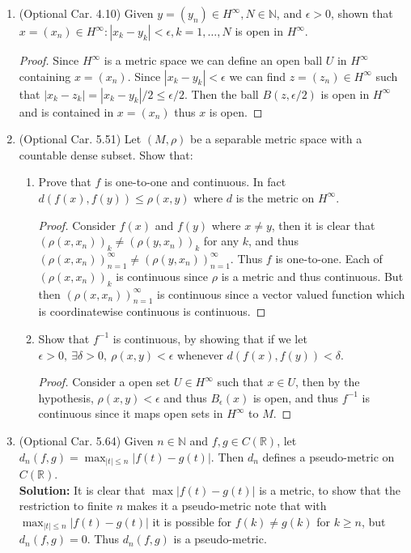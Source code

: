 \documentclass{article}
\newtheorem{proof}{Proof}
\def\ge{\geqslant}
\def\le{\leqslant}
\def\max{\operatorname{max}}
\def\NN{\mathbb N}
\def\RR{\mathbb R}
\begin{document}
\begin{enumerate}
\item (Optional Car. 4.10) Given $y=(y_n)\in H^\infty, N\in \NN$, and
$\epsilon>0$, shown that $x=(x_n)\in H^\infty: |x_k-y_k|<\epsilon, k=1,\ldots,N$
is open in $H^\infty$.
\begin{proof}
Since $H^\infty$ is a metric space we can define an open ball $U$ in $H^\infty$
containing $x=(x_n)$. Since $|x_k-y_k|<\epsilon$ we can 
find $z=(z_n)\in H^\infty$ such that $|x_k-z_k|=|x_k-y_k|/2 \le \epsilon/2$.
Then the ball $B(z,\epsilon/2)$ is open in $H^\infty$ and is contained in 
$x=(x_n)$ thus $x$ is open.
\end{proof}

\item (Optional Car. 5.51) Let $(M,\rho)$ be a separable metric space
with a countable dense subset. Show that:
\begin{enumerate}
\item{Prove that $f$ is one-to-one and continuous. In fact 
$d(f(x),f(y)) \le \rho(x,y)$
where $d$ is the metric on $H^\infty$.}
\begin{proof}
Consider $f(x)$ and $f(y)$ where $x\ne y$, then it is clear that
$(\rho(x,x_n))_k \ne (\rho(y,x_n))_k$ for any $k$, and thus
$(\rho(x,x_n))_{n=1}^\infty \ne (\rho(y,x_n))_{n=1}^\infty$. Thus $f$ is
one-to-one. Each of $(\rho(x,x_n))_k$ is continuous since $\rho$ is
a metric and thus continuous. But then $(\rho(x,x_n))_{n=1}^\infty$
is continuous since a vector valued function which is coordinatewise
continuous is continuous.
\end{proof}
\item{Show that $f^{-1}$ is continuous, by showing that if we let 
$\epsilon>0, \ \exists \delta>0,\ \rho(x,y)<\epsilon$ whenever
$d(f(x),f(y))<\delta$.
}
\begin{proof}
Consider a open set $U\in H^\infty$ such that $x\in U$, then by the
hypothesis, $\rho(x,y)<\epsilon$ and thus $B_\epsilon(x)$ is open, and thus
$f^{-1}$ is continuous since it maps open sets in $H^\infty$ to $M$.
\end{proof}
\end{enumerate}

\item (Optional Car. 5.64) Given $n\in \NN$ and $f,g \in C(\RR)$, let
$d_n(f,g)=\max_{|t|\le n}|f(t)-g(t)|$. Then $d_n$ defines a pseudo-metric
on $C(\RR)$.\\
\textbf{Solution:} It is clear that $\max |f(t)-g(t)|$ is a metric, 
to show that the restriction to finite $n$ makes it 
a pseudo-metric note that with $\max_{|t|\le n}|f(t)-g(t)|$ it is
possible for $f(k)\ne g(k)$ for $k\ge n$, but $d_n(f,g)=0$. Thus
$d_n(f,g)$ is a pseudo-metric.


\end{enumerate}
\end{document}
